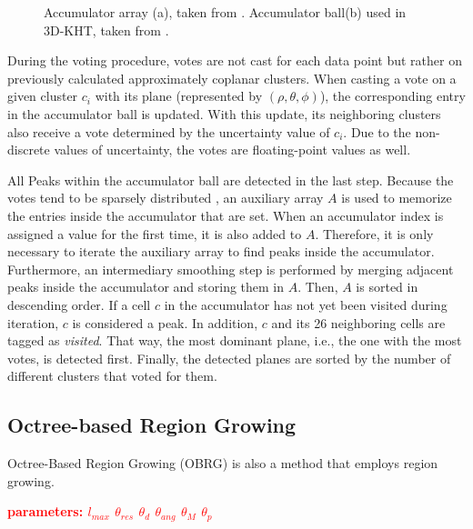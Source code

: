 \documentclass[main.tex]{subfiles}
\begin{document}
\begin{figure}[H]
\begin{subfigure}{0.25\textwidth}
        \caption[3D-KHT Accumulator Ball]{}
        \label{fig:accball}
    \end{subfigure}
    \hspace{\fill}
    \caption[Hough Transform Accumulators]{Accumulator array (a), taken from \cite*[Figure~3]{Borrmann_Elseberg_Lingemann_Nüchter_2011}. Accumulator
        ball(b) used in 3D-KHT, taken from \cite*[Figure~5]{LimbergerOliveira2015HT3D}.}
\end{figure}

During the voting procedure, votes are not cast for each data point but rather on previously calculated approximately coplanar clusters.
When casting a vote on a given cluster $c_i$ with its plane (represented by $(\rho, \theta, \phi)$), the corresponding entry in the accumulator ball is updated.
With this update, its neighboring clusters also receive a vote determined by the uncertainty value of $c_i$. Due to the non-discrete
values of uncertainty, the votes are floating-point values as well.

All Peaks within the accumulator ball are detected in the last step. Because the votes tend to be sparsely distributed \cite[Section~3.4]{LimbergerOliveira2015HT3D},
an auxiliary array $A$ is used to memorize the entries inside the accumulator that are set. When an accumulator index is assigned a value for the first time, it is also added to $A$.
Therefore, it is only necessary to iterate the auxiliary array to find peaks inside the accumulator.
Furthermore, an intermediary smoothing step is performed by merging adjacent peaks inside the accumulator and storing them in $A$.
Then, $A$ is sorted in descending order.
If a cell $c$ in the accumulator has not yet been visited during iteration, $c$ is considered a peak. In addition, $c$ and its 26 neighboring cells are tagged as \textit{visited}.
That way, the most dominant plane, i.e., the one with the most votes, is detected first.
Finally, the detected planes are sorted by the number of different clusters that voted for them.

\subsection{Octree-based Region Growing}
\label{subsec:bg-obrg}
Octree-Based Region Growing (OBRG) \cite{Vo_Truong-Hong_Laefer_Bertolotto_2015} is also a method that employs region growing.

\textbf{\textcolor{red}{parameters: $l_{max}$ $\theta_{res}$  $\theta_{d}$  $\theta_{ang}$  $\theta_M$  $\theta_p$}}
\end{document}

